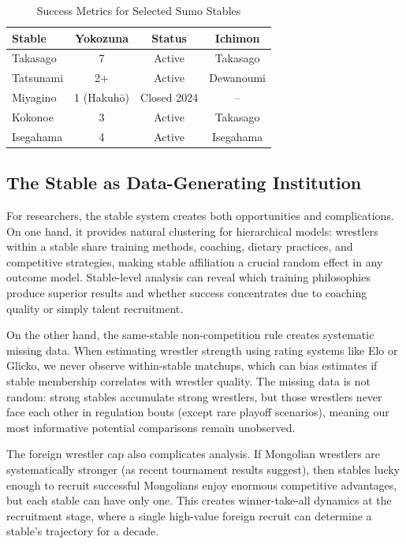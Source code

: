 \begin{table}[h]
\centering
\small
\caption{Success Metrics for Selected Sumo Stables}
\label{tab:stable_success}
\begin{tabular}{lccc}
\toprule
\textbf{Stable} & \textbf{Yokozuna} & \textbf{Status} & \textbf{Ichimon} \\
\midrule
Takasago & 7 & Active & Takasago \\
Tatsunami & 2+ & Active & Dewanoumi \\
Miyagino & 1 (Hakuhō) & Closed 2024 & -- \\
Kokonoe & 3 & Active & Takasago \\
Isegahama & 4 & Active & Isegahama \\
\bottomrule
\end{tabular}
\end{table}

\subsection{The Stable as Data-Generating Institution}

For researchers, the stable system creates both opportunities and complications. On one hand, it provides natural clustering for hierarchical models: wrestlers within a stable share training methods, coaching, dietary practices, and competitive strategies, making stable affiliation a crucial random effect in any outcome model. Stable-level analysis can reveal which training philosophies produce superior results and whether success concentrates due to coaching quality or simply talent recruitment.

On the other hand, the same-stable non-competition rule creates systematic missing data. When estimating wrestler strength using rating systems like Elo or Glicko, we never observe within-stable matchups, which can bias estimates if stable membership correlates with wrestler quality. The missing data is not random: strong stables accumulate strong wrestlers, but those wrestlers never face each other in regulation bouts (except rare playoff scenarios), meaning our most informative potential comparisons remain unobserved.

The foreign wrestler cap also complicates analysis. If Mongolian wrestlers are systematically stronger (as recent tournament results suggest), then stables lucky enough to recruit successful Mongolians enjoy enormous competitive advantages, but each stable can have only one. This creates winner-take-all dynamics at the recruitment stage, where a single high-value foreign recruit can determine a stable's trajectory for a decade.

